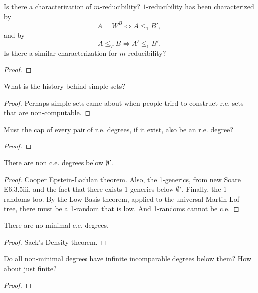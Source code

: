 \begin{theorem}
  Is there a characterization of $m$-reducibility? $1$-reducibility has
  been characterized by
  \[A=W^B \Leftrightarrow A\leq_1 B',\]
  and by
  \[A\leq_T B \Leftrightarrow A'\leq_1 B'.\]
  Is there a similar characterization for $m$-reducibility?
\end{theorem}
\begin{proof}
\end{proof}

\begin{theorem}
  What is the history behind simple sets?
\end{theorem}
\begin{proof}
  Perhaps simple sets came about when people tried to construct
  r.e. sets that are non-computable. 
\end{proof}

\begin{question}
  Must the cap of every pair of r.e. degrees, if it exist, also be an
  r.e. degree?
\end{question}
\begin{proof}
\end{proof}

\begin{theorem}
  There are non c.e. degrees below $\emptyset'$.
\end{theorem}
\begin{proof}
  Cooper Epstein-Lachlan theorem. Also, the 1-generics, from new Soare
  E6.3.5iii, and the fact that there exists 1-generics below
  $\emptyset'$. Finally, the 1-randoms too. By the Low Basis theorem,
  applied to the universal Martin-Lof tree, there must be a 1-random
  that is low. And 1-randoms cannot be c.e.
\end{proof}

\begin{theorem}
  There are no minimal c.e. degrees.
\end{theorem}
\begin{proof}
  Sack's Density theorem.
\end{proof}

\begin{question}
  Do all non-minimal degrees have infinite incomparable degrees below
  them? How about just finite?
\end{question}
\begin{proof}
\end{proof}
